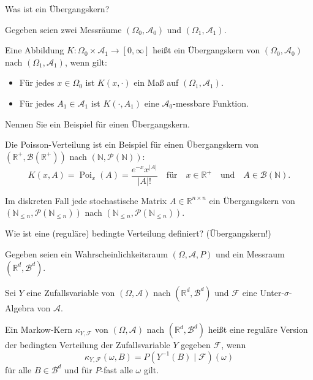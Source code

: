 \begin{QandA}
    \item Was ist ein Übergangskern?
    \begin{answered}
        Gegeben seien zwei Messräume $(\Omega_0, \mathcal{A}_0)$ und $(\Omega_1, \mathcal{A}_1)$.

        Eine Abbildung $K: \Omega_0 \times \mathcal{A}_1 \to [0, \infty]$ heißt ein Übergangskern von $(\Omega_0, \mathcal{A}_0)$ nach $(\Omega_1, \mathcal{A}_1)$, wenn gilt:
        \begin{itemize}
            \item Für jedes $x \in \Omega_0$ ist $K(x, \cdot)$ ein Maß auf $(\Omega_1, \mathcal{A}_1)$.
            \item Für jedes $A_1 \in \mathcal{A}_1$ ist $K(\cdot, A_1)$ eine $\mathcal{A}_0$-messbare Funktion.
        \end{itemize}
    \end{answered}

    \item Nennen Sie ein Beispiel für einen Übergangskern.
    \begin{answered}
        Die Poisson-Verteilung ist ein Beispiel für einen Übergangskern von $(\mathbb{R}^+, \mathcal{B}(\mathbb{R}^+))$ nach $(\mathbb{N}, \mathcal{P}(\mathbb{N}))$:
        \[
            K(x, A) = \operatorname{Poi}_x(A) = \frac{e^{-x} x^{|A|}}{|A|!} \quad \text{für} \quad x \in \mathbb{R}^+ \quad \text{und} \quad A \in \mathcal{B}(\mathbb{N}).
        \]

        Im diskreten Fall jede stochastische Matrix $A \in \mathbb{R}^{n \times n}$ ein Übergangskern von $(\mathbb{N}_{\leq n}, \mathcal{P}(\mathbb{N}_{\leq n}))$ nach $(\mathbb{N}_{\leq n}, \mathcal{P}(\mathbb{N}_{\leq n}))$.
    \end{answered}

    \item Wie ist eine (reguläre) bedingte Verteilung definiert? (Übergangskern!)
    \begin{answered}
        Gegeben seien ein Wahrscheinlichkeitsraum $(\Omega ,{\mathcal{A}},P)$ und ein Messraum $(\mathbb{R}^d,{\mathcal{B}}^d)$.

        Sei $Y$ eine Zufallsvariable von $(\Omega ,{\mathcal{A}})$ nach $(\mathbb{R}^d,{\mathcal{B}}^d)$ und $\mathcal{F}$ eine Unter-$\sigma$-Algebra von ${\mathcal{A}}$.

        Ein Markow-Kern $\kappa_{Y,{\mathcal{F}}}$ von $(\Omega ,{\mathcal{A}})$ nach $(\mathbb{R}^d,{\mathcal{B}}^d)$ heißt eine reguläre Version der bedingten Verteilung der Zufallsvariable $Y$ gegeben $\mathcal{F}$, wenn
        \[
            \kappa_{Y,{\mathcal{F}}}(\omega ,B)=P(Y^{-1}(B)\mid{\mathcal{F}})(\omega )
        \]
        für alle $B \in{\mathcal{B}^d}$ und für $P$-fast alle $\omega$ gilt.


\end{answered}
\end{QandA}
